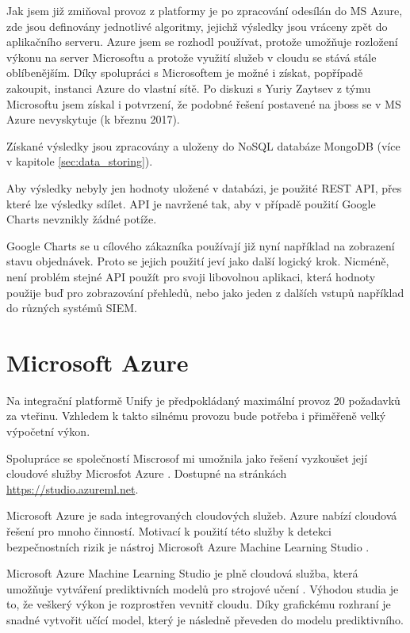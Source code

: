 \documentclass[thesis=M,czech]{FITthesis}[2012/10/20]
\begin{document}
	Jak jsem již zmiňoval provoz z platformy je po zpracování odesílán do MS Azure, zde jsou definovány jednotlivé algoritmy, jejichž výsledky jsou vráceny zpět do aplikačního serveru. Azure jsem se rozhodl používat, protože umožňuje rozložení výkonu na server Microsoftu a protože využití služeb v cloudu se stává stále oblíbenějším. Díky spolupráci s Microsoftem je možné i získat, popřípadě zakoupit, instanci Azure do vlastní sítě. Po diskuzi s Yuriy Zaytsev z týmu Microsoftu jsem získal i potvrzení, že podobné řešení postavené na jboss se v MS Azure nevyskytuje (k březnu 2017).
	
	Získané výsledky jsou zpracovány a uloženy do NoSQL databáze MongoDB (více v kapitole \ref{sec:data_storing}).
	
	Aby výsledky nebyly jen hodnoty uložené v databázi, je použité REST API, přes které lze výsledky sdílet. API je navržené tak, aby v případě použití Google Charts nevznikly žádné potíže. 
	
	Google Charts se u cílového zákazníka používají již nyní například na zobrazení stavu objednávek. Proto se jejich použití jeví jako další logický krok. Nicméně, není problém stejné API použít pro svoji libovolnou aplikaci, která hodnoty použije buď pro zobrazování přehledů, nebo jako jeden z dalších vstupů například do různých systémů SIEM.

	\section{Microsoft Azure}
		\label{sec:ms_azure}
		Na integrační platformě Unify \cite{unify} je předpokládaný maximální provoz 20 požadavků za vteřinu. Vzhledem k takto silnému provozu bude potřeba i přiměřeně velký výpočetní výkon. 
			
		Spolupráce se společností Miscrosof \cite{microsoft} mi umožnila jako řešení vyzkoušet její cloudové služby Microsfot Azure \cite{msAzure}. Dostupné na stránkách \url{https://studio.azureml.net}.
			
		Microsoft Azure je sada integrovaných cloudových služeb. Azure nabízí cloudová řešení pro mnoho činností. Motivací k použití této služby k detekci bezpečnostních rizik je nástroj Microsoft Azure Machine Learning Studio \cite{msAzureStudio}.
			
		Microsoft Azure Machine Learning Studio je plně cloudová služba, která umožňuje vytváření prediktivních modelů pro strojové učení \cite{msAzureStudio}. Výhodou studia je to, že veškerý výkon je rozprostřen vevnitř cloudu. Díky grafickému rozhraní je snadné vytvořit učící model, který je následně převeden do modelu prediktivního.
			
\end{document}
